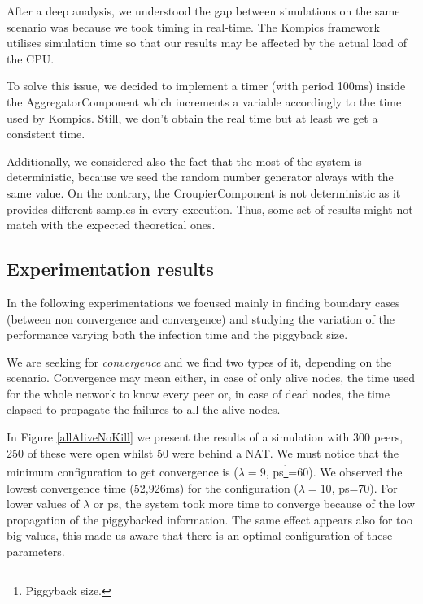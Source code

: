 \documentclass[10pt,a4paper]{proc}
\begin{document}
After a deep analysis, we understood the gap between simulations on the same scenario was because we took timing in real-time. The Kompics framework utilises simulation time so that our results may be affected by the actual load of the CPU.

To solve this issue, we decided to implement a timer (with period 100ms) inside the AggregatorComponent which increments a variable accordingly to the time used by Kompics. Still, we don't obtain the real time but at least we get a consistent time.

Additionally, we considered also the fact that the most of the system is deterministic, because we seed the random number generator always with the same value. On the contrary, the CroupierComponent is not deterministic as it provides different samples in every execution. Thus, some set of results might not match with the expected theoretical ones.

\subsection{Experimentation results}

In the following experimentations we focused mainly in finding boundary cases (between non convergence and convergence) and studying the variation of the performance varying both the infection time and the piggyback size.

We are seeking for \emph{convergence} and we find two types of it, depending on the scenario. Convergence may mean either, in case of only alive nodes, the time used for the whole network to know every peer or, in case of dead nodes, the time elapsed to propagate the failures to all the alive nodes.

In Figure \ref{allAliveNoKill} we present the results of a simulation with 300 peers, 250 of these were open whilst 50 were behind a NAT. We must notice that the minimum configuration to get convergence is ($\lambda=9$, ps\footnote{Piggyback size.}=60). We observed the lowest convergence time (52,926ms) for the configuration ($\lambda=10$, ps=70). For lower values of $\lambda$ or ps, the system took more time to converge because of the low propagation of the piggybacked information. The same effect appears also for too big values, this made us aware that there is an optimal configuration of these parameters.
\end{document}
